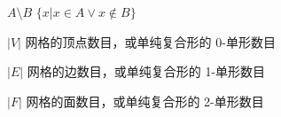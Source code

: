 
\begin{notation}

  \begin{notationlist}{2em}
    \item[$\displaystyle A \setminus B $] $ \{x | x \in A \vee x \notin B \} $
    \item[$\displaystyle |V|$] 网格的顶点数目，或单纯复合形的 0-单形数目
    \item[$\displaystyle |E|$] 网格的边数目，或单纯复合形的 1-单形数目
    \item[$\displaystyle |F|$] 网格的面数目，或单纯复合形的 2-单形数目 
  \end{notationlist}

\end{notation}





